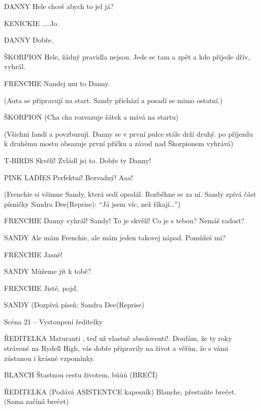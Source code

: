 DANNY        Hele chceš abych to jel já? 

KENICKIE        ....Jo.

DANNY        Dobře. 

ŠKORPION        Hele, žádný pravidla nejsou. Jede se tam a zpět a kdo přijede dřív,         vyhrál. 

FRENCHIE        Nandej mu to Danny. 

(Auta se připravují na start. Sandy přichází a posadí se mimo ostatní.)

ŠKORPION         (Cha cha rozvazuje šátek a mává na startu)

                (Všichni fandí a povzbuzují. Danny se v první pulce stále drží druhý.                po příjezdu k druhému mostu obsazuje první příčku a závod nad                 Škorpionem vyhrává)

T-BIRDS        Skvělí! Zvládl jsi to. Dobře ty Danny!

PINK LADIES        Perfektní! Bezvadný! Aaa!





(Frenchie si všimne Sandy, která sedí opodál. Rozběhne se za ní. Sandy zpívá část písničky Sandra Dee(Reprise): “Já jsem víc, než říkají…”)





FRENCHIE        Danny vyhrál! Sandy! To je skvělí! Co je s tebou? Nemáš radost?

SANDY        Ale mám Frenchie, ale mám jeden takovej nápad. Pomůžeš mi? 

FRENCHIE        Jasně! 

SANDY        Můžeme jít k tobě? 

FRENCHIE        Jistě, pojď. 

SANDY        (Dozpívá píseň: Sandra Dee(Reprise)









Scéna 21  – Vystoupení ředitelky 

ŘEDITELKA        Maturanti , teď už vlastně absoloventi!.  Doufám, že ty roky strávené na         Rydell High, vás dobře připravily na život a věřím, že s vámi zůstanou i         krásné vzpomínky. 

BLANCH        Štastnou cestu životem, bůůů (BREČÍ)

ŘEDITELKA        (Podává ASISTENTCE kapesník) Blanche, přestaňte brečet. (Sama                 začíná brečet)






